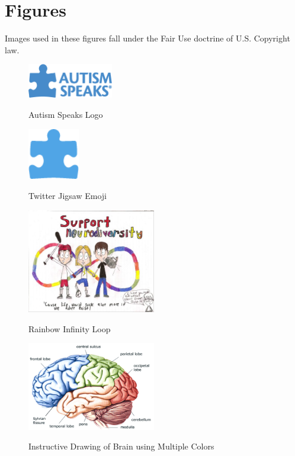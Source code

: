 \section{Figures}
\label{apx:figures}

Images used in these figures fall under the Fair Use doctrine of U.S. Copyright law.

\begin{figure}[ht]
\caption{Autism Speaks Logo}
\centering
\includegraphics[width=0.333\textwidth]{aspeaks}
\label{fig:aspeaks}
\end{figure}

\begin{figure}[ht]
\caption{Twitter Jigsaw Emoji}
\centering
\includegraphics[width=0.2\textwidth]{twitterJigsaw}
\label{fig:twitterJigsaw}
\end{figure}

\begin{figure}[ht]
\caption{Rainbow Infinity Loop}
\centering
\includegraphics[width=0.5\textwidth]{infinity.jpg}
\label{fig:infinity}
\end{figure}

\begin{figure}[ht]
\caption{Instructive Drawing of Brain using Multiple Colors}
\centering
\includegraphics[width=0.5\textwidth]{brainparts.png}
\label{fig:brainparts}
\end{figure}

